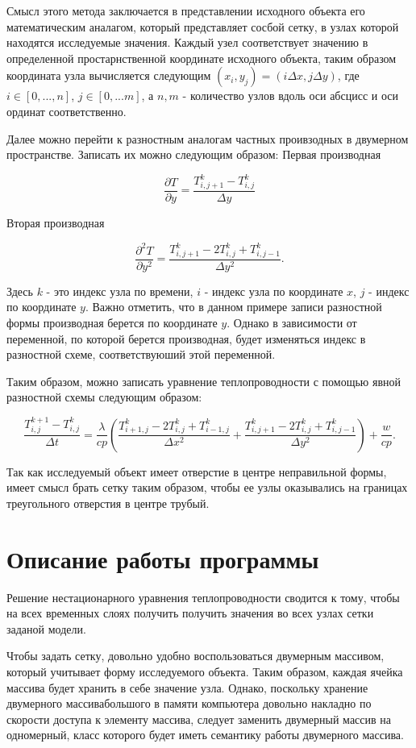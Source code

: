 \documentclass[12pt, a4paper]{article}
\begin{document}
	Смысл этого метода заключается в представлении исходного объекта его математическим аналагом, который представляет сосбой сетку, в узлах которой находятся исследуемые значения. Каждый узел соответствует значению в определенной простарнственной координате исходного объекта, таким образом координата узла вычисляется следующим $(x_i, y_j) = (i\Delta x, j\Delta y)$, где $i \in [0, ..., n]$, $j \in [0, ... m]$, а $n, m$ - количество узлов вдоль оси абсцисс и оси ординат соответственно.
	
	Далее можно перейти к разностным аналогам частных проивзодных в двумерном пространстве. Записать их можно следующим образом:
	Первая производная
	
	\[
	\frac{\partial T}{\partial y} = \frac{T^k_{i, j + 1} - T^k_{i,j}}{\Delta y}
	\]
	
	Вторая производная
	
	\[
	\frac{\partial^2 T}{\partial y^2} = \frac{T^k_{i, j + 1} - 2T^k_{i,j} + T^k_{i,j-1}}{\Delta y^2}.
	\]
	
	Здесь $k$ - это индекс узла по времени, $i$ - индекс узла по координате $x$, $j$ - индекс по координате $y$.
	Важно отметить, что в данном примере записи разностной формы производная берется по координате $y$. Однако в зависимости от переменной, по которой берется производная, будет изменяться индекс в разностной схеме, соответствуюший этой переменной.
	
	Таким образом, можно записать уравнение теплопроводности с помощью явной разностной схемы следующим образом:
	
	\[
	\frac{T^{k + 1}_{i, j} - T^k_{i,j}}{\Delta t} = \frac{\lambda}{cp} \left( \frac{T^k_{i + 1, j} - 2T^k_{i,j} + T^k_{i - 1,j}}{\Delta x^2} + \frac{T^k_{i, j + 1} - 2T^k_{i,j} + T^k_{i,j-1}}{\Delta y^2} \right) + \frac{w}{cp}.
	\]
	
	Так как исследуемый объект имеет отверстие в центре неправильной формы, имеет смысл брать сетку таким образом, чтобы ее узлы оказывались на границах треугольного отверстия в центре трубый.
	
	\section{Описание работы программы}
	
	Решение нестационарного уравнения теплопроводности сводится к тому, чтобы на всех временных слоях получить получить значения во всех узлах сетки заданой модели.
	
	Чтобы задать сетку, довольно удобно воспользоваться двумерным массивом, который учитывает форму исследуемого объекта. Таким образом, каждая ячейка массива будет хранить в себе значение узла. Однако, поскольку хранение двумерного массивабольшого в памяти компьютера довольно накладно по скорости доступа к элементу массива, следует заменить двумерный массив на одномерный, класс которого будет иметь семантику работы двумерного массива.
	
\end{document}
